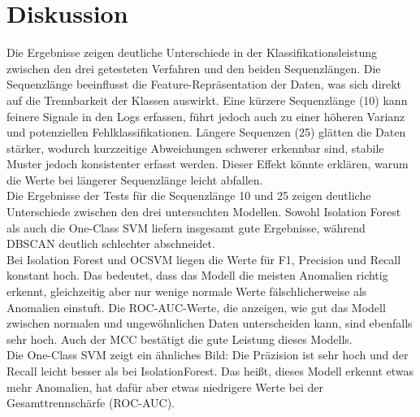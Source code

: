\documentclass[a4paper,12pt]{article}
\begin{document}
	\section{Diskussion}
	Die Ergebnisse zeigen deutliche Unterschiede in der Klassifikationsleistung zwischen den drei getesteten Verfahren und den beiden Sequenzlängen. Die Sequenzlänge beeinflusst die Feature-Repräsentation der Daten, was sich direkt auf die Trennbarkeit der Klassen auswirkt. Eine kürzere Sequenzlänge (10) kann feinere Signale in den Logs erfassen, führt jedoch auch zu einer höheren Varianz und potenziellen Fehlklassifikationen. Längere Sequenzen (25) glätten die Daten stärker, wodurch kurzzeitige Abweichungen schwerer erkennbar sind, stabile Muster jedoch konsistenter erfasst werden. Dieser Effekt könnte erklären, warum die Werte bei längerer Sequenzlänge leicht abfallen.
	\\[0.5em]
	Die Ergebnisse der Tests für die Sequenzlänge 10 und 25 zeigen deutliche Unterschiede zwischen den drei untersuchten Modellen. Sowohl Isolation Forest als auch die One-Class SVM liefern insgesamt gute Ergebnisse, während DBSCAN deutlich schlechter abschneidet.
	\\[0.5em]
	Bei Isolation Forest und OCSVM liegen die Werte für F1, Precision und Recall konstant hoch. Das bedeutet, dass das Modell die meisten Anomalien richtig erkennt, gleichzeitig aber nur wenige normale Werte fälschlicherweise als Anomalien einstuft. Die ROC-AUC-Werte, die anzeigen, wie gut das Modell zwischen normalen und ungewöhnlichen Daten unterscheiden kann, sind ebenfalls sehr hoch. Auch der MCC bestätigt die gute Leistung dieses Modells.
	\\[0.5em]
	Die One-Class SVM zeigt ein ähnliches Bild: Die Präzision ist sehr hoch und der Recall leicht besser als bei IsolationForest. Das heißt, dieses Modell erkennt etwas mehr Anomalien, hat dafür aber etwas niedrigere Werte bei der Gesamttrennschärfe (ROC-AUC).
	\\[0.5em]
\end{document}
